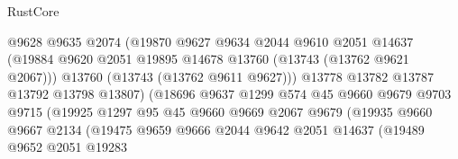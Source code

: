 \begin{lexlean}{RustCore}
\begin{coremodule}
                                    @9628
                                    @9635
                                    @2074
                                    (@19870
                                      @9627
                                      @9634
                                      @2044
                                      @9610
                                      @2051
                                      @14637
                                      (@19884
                                        @9620
                                        @2051
                                        @19895
                                        @14678
                                        @13760
                                        (@13743 (@13762 @9621 @2067)))
                                      @13760
                                      (@13743 (@13762 @9611 @9627)))
                                    @13778
                                    @13782
                                    @13787
                                    @13792
                                    @13798
                                    @13807)
                                  (@18696
                                    @9637
                                    @1299
                                    @574
                                    @45
                                    @9660
                                    @9679
                                    @9703
                                    @9715
                                    (@19925
                                      @1297
                                      @95
                                      @45
                                      @9660
                                      @9669
                                      @2067
                                      @9679
                                      (@19935
                                        @9660
                                        @9667
                                        @2134
                                        (@19475
                                          @9659
                                          @9666
                                          @2044
                                          @9642
                                          @2051
                                          @14637
                                          (@19489
                                            @9652
                                            @2051
                                            @19283

\end{coremodule}
\end{lexlean}
